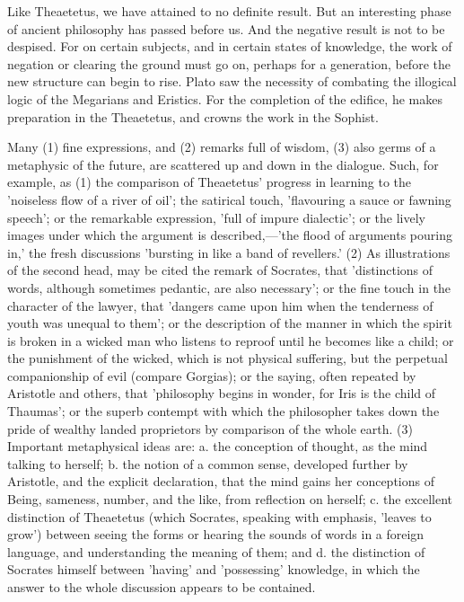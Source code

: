 \documentclass[11pt,letter]{article}
\begin{document}
\par  Like Theaetetus, we have attained to no definite result. But an interesting phase of ancient philosophy has passed before us. And the negative result is not to be despised. For on certain subjects, and in certain states of knowledge, the work of negation or clearing the ground must go on, perhaps for a generation, before the new structure can begin to rise. Plato saw the necessity of combating the illogical logic of the Megarians and Eristics. For the completion of the edifice, he makes preparation in the Theaetetus, and crowns the work in the Sophist.

\par  Many (1) fine expressions, and (2) remarks full of wisdom, (3) also germs of a metaphysic of the future, are scattered up and down in the dialogue. Such, for example, as (1) the comparison of Theaetetus' progress in learning to the 'noiseless flow of a river of oil'; the satirical touch, 'flavouring a sauce or fawning speech'; or the remarkable expression, 'full of impure dialectic'; or the lively images under which the argument is described,—'the flood of arguments pouring in,' the fresh discussions 'bursting in like a band of revellers.' (2) As illustrations of the second head, may be cited the remark of Socrates, that 'distinctions of words, although sometimes pedantic, are also necessary'; or the fine touch in the character of the lawyer, that 'dangers came upon him when the tenderness of youth was unequal to them'; or the description of the manner in which the spirit is broken in a wicked man who listens to reproof until he becomes like a child; or the punishment of the wicked, which is not physical suffering, but the perpetual companionship of evil (compare Gorgias); or the saying, often repeated by Aristotle and others, that 'philosophy begins in wonder, for Iris is the child of Thaumas'; or the superb contempt with which the philosopher takes down the pride of wealthy landed proprietors by comparison of the whole earth. (3) Important metaphysical ideas are: a. the conception of thought, as the mind talking to herself; b. the notion of a common sense, developed further by Aristotle, and the explicit declaration, that the mind gains her conceptions of Being, sameness, number, and the like, from reflection on herself; c. the excellent distinction of Theaetetus (which Socrates, speaking with emphasis, 'leaves to grow') between seeing the forms or hearing the sounds of words in a foreign language, and understanding the meaning of them; and d. the distinction of Socrates himself between 'having' and 'possessing' knowledge, in which the answer to the whole discussion appears to be contained.
\end{document}
